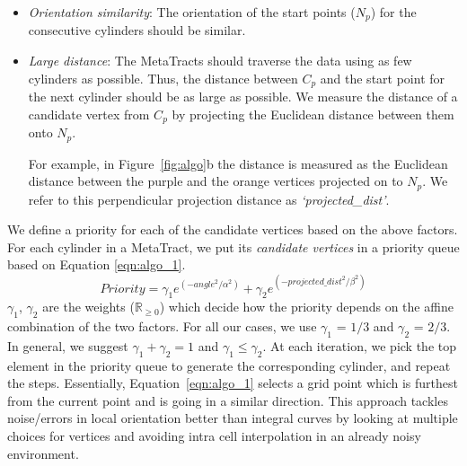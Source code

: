 \begin{itemize}
\item \textit{Orientation similarity}: The orientation of the start points ($N_p$) for the consecutive cylinders should be similar. 
\item \textit{Large distance}: The MetaTracts should traverse the data using as few cylinders as possible. Thus, the distance between $C_p$ and the start point for the next cylinder should be as large as possible. We measure the distance of a candidate vertex from $C_p$ by projecting the Euclidean distance between them onto $N_p$. 

For example, in Figure~\ref{fig:algo}b the distance is measured as the Euclidean distance between the purple and the orange vertices projected on to $N_p$. We refer to this perpendicular projection distance as \textit{`projected\_dist'}. 

\end{itemize}
We define a priority for each of the candidate vertices based on the above factors.
For each cylinder in a MetaTract, we put its \textit{candidate vertices} in a priority queue based on Equation \ref{eqn:algo_1}.
\begin{equation}
Priority = \gamma_1 e^{(-angle^2 / \alpha^2)} + \gamma_2e^{(-projected\_dist^2 / \beta^2)}
\label{eqn:algo_1}
\end{equation}
$\gamma_1$, $\gamma_2$ are the  weights ($\mathbb{R}_{\ge 0}$)  which decide how the priority depends on the affine combination of the two factors. For all our cases, we use $\gamma_1$ = $1 / 3 $ and $\gamma_2$ = $2 / 3$. In general, we suggest $\gamma_1 +\gamma_2 = 1 $ and $\gamma_1 \leq \gamma_2$. At each iteration, we pick the top element in the priority queue to generate the corresponding cylinder, and repeat the steps. Essentially, Equation~\ref{eqn:algo_1} selects a grid point which is furthest from the current point and is going in a similar direction. This approach tackles noise/errors in local orientation better than integral curves by looking at multiple choices for vertices and avoiding intra cell interpolation in an already noisy environment. 
 
